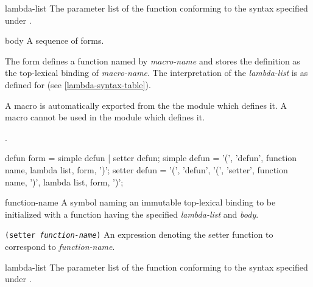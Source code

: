 \begin{optDefinition}
\begin{arguments}
    \item[lambda-list] The parameter list of the function conforming to the
    syntax specified under .

    \item[body] A sequence of forms.
\end{arguments}
%
\remarks%
The  form defines a function named by
{\em macro-name} and stores the definition as the top-lexical binding of {\em
    macro-name}.  The interpretation
of the {\em lambda-list} is as defined for  (see
\ref{lambda-syntax-table}).
%
\begin{note}
    A macro is automatically exported from the the module which defines it.  A
    macro cannot be used in the module which defines it.
\end{note}
%
\seealso%
.

%
\Syntax
\savesyntax{}\vbox{\syntax
defun form
   = simple defun
   | setter defun;
simple defun
   = '(', 'defun', function name, lambda list,
     {form}, ')';
setter defun
   = '(', 'defun',
          '(', 'setter', function name, ')',
          lambda list, {form}, ')';
\endsyntax}
%
\begin{arguments}
    \item[function-name] A symbol naming an immutable top-lexical binding to be
    initialized with a function having the specified {\em lambda-list} and {\em
        body}.

    \item[{\tt (setter {\em function-name})}] An expression denoting the setter
    function to correspond to {\em function-name}.

    \item[lambda-list] The parameter list of the function conforming to the
    syntax specified under .


\end{arguments}
\end{optDefinition}
